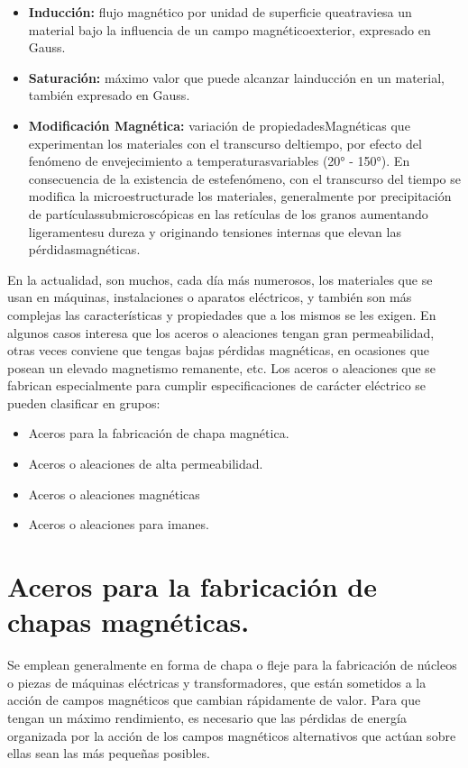 \documentclass[12pt,a4paper]{article}
\begin{document}
\begin{itemize}
    \item \textbf{Inducción:} flujo magnético por unidad de superficie queatraviesa un material bajo la influencia de un campo magnéticoexterior, expresado en Gauss.
    \item \textbf{Saturación:} máximo valor que puede alcanzar lainducción en un material, también expresado en Gauss.
    \item \textbf{Modificación Magnética:} variación de propiedadesMagnéticas que experimentan los materiales con el transcurso deltiempo, por efecto del fenómeno de envejecimiento a temperaturasvariables (20° - 150°). En consecuencia de la existencia de estefenómeno, con el transcurso del tiempo se modifica la microestructurade los materiales, generalmente por precipitación de partículassubmicroscópicas en las retículas de los granos aumentando ligeramentesu dureza y originando tensiones internas que elevan las  pérdidasmagnéticas.
\end{itemize}

En la actualidad, son muchos, cada día más numerosos, los materiales que se usan en máquinas, instalaciones o aparatos eléctricos, y también son más complejas las características y propiedades que a los mismos se les exigen.
En algunos casos interesa que los aceros o aleaciones tengan gran permeabilidad, otras veces conviene que tengas bajas pérdidas magnéticas, en ocasiones que posean un elevado magnetismo remanente, etc. 
Los aceros o aleaciones que se fabrican especialmente para cumplir especificaciones de carácter eléctrico se pueden clasificar en grupos:

\begin{itemize}
    \item Aceros para la fabricación de chapa magnética.
    \item Aceros o aleaciones de alta permeabilidad.
    \item Aceros o aleaciones magnéticas
    \item Aceros o aleaciones para imanes.
\end{itemize}

\section{Aceros para la fabricación de chapas magnéticas.}

Se emplean generalmente en forma de chapa o fleje para la fabricación de núcleos o piezas de máquinas eléctricas y transformadores, que están sometidos a la acción de campos magnéticos que cambian rápidamente de valor. Para que tengan un máximo rendimiento, es necesario que las pérdidas de energía organizada por la acción de los campos magnéticos alternativos que actúan sobre ellas sean las más pequeñas posibles.
\end{document}
